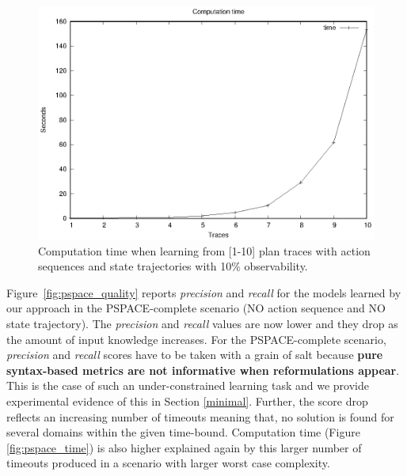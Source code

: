 \begin{figure}[hbt!]
	\centering
	\includegraphics[width=0.7\linewidth]{figures/input_size_100_10_time.eps}
	\caption{Computation time when learning from [1-10] plan traces with \FO action sequences and \PO state trajectories with 10\% observability.}
	\label{fig:np_time}
\end{figure}

\newpage
Figure~\ref{fig:pspace_quality} reports {\em precision} and {\em recall} for the models learned by our approach in the PSPACE-complete scenario (NO action sequence and NO state trajectory). The {\em precision} and {\em recall} values are now lower and they drop as the amount of input knowledge increases. For the PSPACE-complete scenario, {\em precision} and {\em recall} scores have to be taken with a grain of salt because {\bf pure syntax-based metrics are not informative when reformulations appear}. This is the case of such an under-constrained learning task and we provide experimental evidence of this in Section \ref{minimal}. Further, the score drop reflects an increasing number of timeouts meaning that, no solution is found for several domains within the given time-bound. Computation time (Figure \ref{fig:pspace_time}) is also higher explained again by this larger number of timeouts produced in a scenario with larger worst case complexity.


